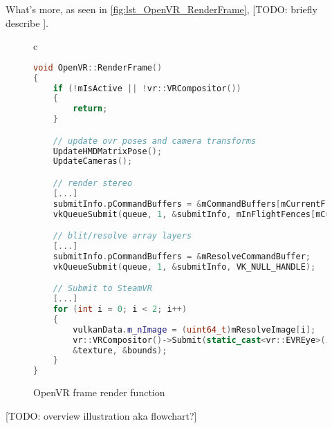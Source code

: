 What's more, as seen in \autoref{fig:lst_OpenVR_RenderFrame}, [TODO: briefly describe ]. \\

\begin{figure}[htpb]
  \centering
  \begin{tabular}{c}
  \begin{lstlisting}[language=C++]
void OpenVR::RenderFrame()
{
	if (!mIsActive || !vr::VRCompositor())
	{
		return;
	}

	// update ovr poses and camera transforms
	UpdateHMDMatrixPose();
	UpdateCameras();

	// render stereo
	[...]
	submitInfo.pCommandBuffers = &mCommandBuffers[mCurrentFrame];
	vkQueueSubmit(queue, 1, &submitInfo, mInFlightFences[mCurrentFrame]);

	// blit/resolve array layers
	[...]
	submitInfo.pCommandBuffers = &mResolveCommandBuffer;
	vkQueueSubmit(queue, 1, &submitInfo, VK_NULL_HANDLE);

	// Submit to SteamVR
	[...]
	for (int i = 0; i < 2; i++)
	{
		vulkanData.m_nImage = (uint64_t)mResolveImage[i];
		vr::VRCompositor()->Submit(static_cast<vr::EVREye>(i), 
		&texture, &bounds);
	}
}
	\end{lstlisting}
  \end{tabular}
  \caption[OpenVR render target's RenderFrame]{OpenVR frame render function}\label{fig:lst_OpenVR_RenderFrame}
\end{figure}

[TODO: overview illustration aka flowchart?]